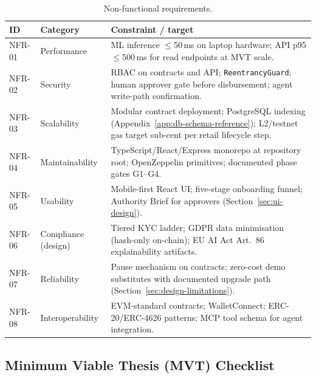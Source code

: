 \documentclass[12pt,a4paper]{report}
\newcommand{\tableheadcolor}{\rowcolor{TableHeadBg}}
\begin{document}
\begin{table}[H]
\centering
\caption[Non-functional requirements]{Non-functional requirements.}
\label{tab:nonfunctional-requirements}
\small
\begin{tabular}{@{}p{1.2cm}p{2.4cm}p{10.6cm}@{}}
\toprule
\tableheadcolor
\textbf{ID} & \textbf{Category} & \textbf{Constraint / target} \\
\midrule
NFR-01 & Performance & ML inference $\leq$50\,ms on laptop hardware; API p95 $\leq$500\,ms for read endpoints at MVT scale. \\
NFR-02 & Security & RBAC on contracts and API; \texttt{ReentrancyGuard}; human approver gate before disbursement; agent write-path confirmation. \\
NFR-03 & Scalability & Modular contract deployment; PostgreSQL indexing (Appendix~\ref{app:db-schema-reference}); L2/testnet gas target sub-cent per retail lifecycle step. \\
NFR-04 & Maintainability & TypeScript/React/Express monorepo at repository root; OpenZeppelin primitives; documented phase gates G1--G4. \\
NFR-05 & Usability & Mobile-first React UI; five-stage onboarding funnel; Authority Brief for approvers (Section~\ref{sec:ui-design}). \\
NFR-06 & Compliance (design) & Tiered KYC ladder; GDPR data minimisation (hash-only on-chain); EU AI Act Art.~86 explainability artifacts. \\
NFR-07 & Reliability & Pause mechanism on contracts; zero-cost demo substitutes with documented upgrade path (Section~\ref{sec:design-limitations}). \\
NFR-08 & Interoperability & EVM-standard contracts; WalletConnect; ERC-20/ERC-4626 patterns; MCP tool schema for agent integration. \\
\bottomrule
\end{tabular}
\end{table}

\subsection{Minimum Viable Thesis (MVT) Checklist}
\label{sec:mvt-checklist}
\end{document}
